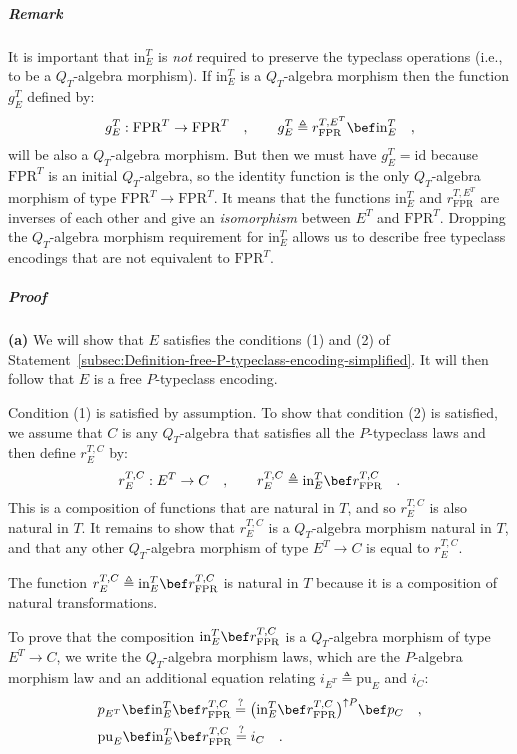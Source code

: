 \subparagraph{Remark}

It is important that $\text{in}_{E}^{T}$ is \emph{not} required to
preserve the typeclass operations (i.e., to be a $Q_{T}$-algebra
morphism). If $\text{in}_{E}^{T}$ is a $Q_{T}$-algebra morphism
then the function $g_{E}^{T}$ defined by:
\[
g_{E}^{T}:\text{FPR}^{T}\rightarrow\text{FPR}^{T}\quad,\quad\quad g_{E}^{T}\triangleq r_{\text{FPR}}^{T,E^{T}}\bef\text{in}_{E}^{T}\quad,
\]
will be also a $Q_{T}$-algebra morphism. But then we must have $g_{E}^{T}=\text{id}$
because $\text{FPR}^{T}$ is an initial $Q_{T}$-algebra, so the identity
function is the only $Q_{T}$-algebra morphism of type $\text{FPR}^{T}\rightarrow\text{FPR}^{T}$.
It means that the functions $\text{in}_{E}^{T}$ and $r_{\text{FPR}}^{T,E^{T}}$
are inverses of each other and give an \emph{isomorphism} between
$E^{T}$ and $\text{FPR}^{T}$. Dropping the $Q_{T}$-algebra morphism
requirement for $\text{in}_{E}^{T}$ allows us to describe free typeclass
encodings that are not equivalent to $\text{FPR}^{T}$.

\subparagraph{Proof}

\textbf{(a)} We will show that $E$ satisfies the conditions (1) and
(2) of Statement~\ref{subsec:Definition-free-P-typeclass-encoding-simplified}.
It will then follow that $E$ is a free $P$-typeclass encoding. 

Condition (1) is satisfied by assumption. To show that condition (2)
is satisfied, we assume that $C$ is any $Q_{T}$-algebra that satisfies
all the $P$-typeclass laws and then define $r_{E}^{T,C}$ by:
\[
r_{E}^{T,C}:E^{T}\rightarrow C\quad,\quad\quad r_{E}^{T,C}\triangleq\text{in}_{E}^{T}\bef r_{\text{FPR}}^{T,C}\quad.
\]
This is a composition of functions that are natural in $T$, and so
$r_{E}^{T,C}$ is also natural in $T$. It remains to show that $r_{E}^{T,C}$
is a $Q_{T}$-algebra morphism natural in $T$, and that any other
$Q_{T}$-algebra morphism of type $E^{T}\rightarrow C$ is equal to
$r_{E}^{T,C}$.

The function $r_{E}^{T,C}\triangleq\text{in}_{E}^{T}\bef r_{\text{FPR}}^{T,C}$
is natural in $T$ because it is a composition of natural transformations.

To prove that the composition $\text{in}_{E}^{T}\bef r_{\text{FPR}}^{T,C}$
is a $Q_{T}$-algebra morphism of type $E^{T}\rightarrow C$, we write
the $Q_{T}$-algebra morphism laws, which are the $P$-algebra morphism
law and an additional equation relating $i_{E^{T}}\triangleq\text{pu}_{E}$
and $i_{C}$: 
\begin{align}
 & p_{E^{T}}\bef\text{in}_{E}^{T}\bef r_{\text{FPR}}^{T,C}\overset{?}{=}\big(\text{in}_{E}^{T}\bef r_{\text{FPR}}^{T,C}\big)^{\uparrow P}\bef p_{C}\quad,\label{eq:P-algebra-morphism-law-for-in-r-derivation1}\\
 & \text{pu}_{E}\bef\text{in}_{E}^{T}\bef r_{\text{FPR}}^{T,C}\overset{?}{=}i_{C}\quad.\nonumber 
\end{align}

